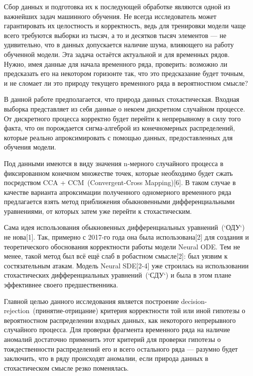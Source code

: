 \documentclass{article}
\begin{document}
   \par Сбор данных и подготовка их к последующей обработке являются одной из важнейших задач машинного обучения. Не всегда исследователь может гарантировать их целостность и корректность, ведь для тренировки модели чаще всего требуются выборки из тысяч, а то и десятков тысяч элементов --- не удивительно, что в данных допускается наличие шума, влияющего на работу обученной модели. Эта задача остаётся актуальной и для временных рядов. Нужно, имея данные для начала временного ряда, проверить: возможно ли предсказать его на некотором горизонте так, что это предсказание будет точным, и не сломает ли это природу текущего временного ряда в вероятностном смысле?
   \par В данной работе предполагается, что природа данных стохастическая. Входная выборка представляет из себя данные о некоем дискретном случайном процессе. От дискретного процесса корректно будет перейти к непрерывному в силу того факта, что он порождается сигма-алгеброй из конечномерных распределений, которые реально апроксимировать с помощью данных, предоставленных для обучения модели.
   \par Под данными имеются в виду значения n-мерного случайного процесса в фиксированном конечном множестве точек, которые необходимо будет сжать посредством CCA + CCM~(Convergent-Cross Mapping)[6]. В таком случае в качестве варианта апроксимации полученного одномерного временного ряда предлагается взять метод приближения обыкновенными дифференциальными уравнениями, от которых затем уже перейти к стохастическим.
   \par Сама идея использования обыкновенных дифференциальных уравнений~(`ОДУ`) не нова[1]. Так, примерно с 2017-го года она была использована[2] для создания и теоретического обоснования корректности работы модели Neural ODE. Тем не менее, такой метод был всё ещё слаб в робастном смысле[2]: был уязвим к состязательным атакам. Модель Neural SDE[2-4] уже строилась на использовании стохастических дифференциальных уравнений~(`СДУ`) и была в этом плане эффективнее своего предшественника.
   \par Главной целью данного исследования является построение decision-rejection~(принятие-отрицание) критерия корректности той или иной гипотезы о вероятностном распределении входных данных, как некоторого непрерывного случайного процесса. Для проверки фрагмента временного ряда на наличие аномалий достаточно применить этот критерий для проверки гипотезы о тождественности распределений его и всего остального ряда --- разумно будет заключить, что в ряду происходят аномалии, если природа данных в стохастическом смысле резко поменялась.
\end{document}
